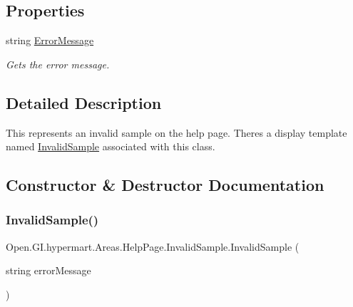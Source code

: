 \subsection*{Properties}
\begin{DoxyCompactItemize}
\item 
string \hyperlink{class_open_1_1_g_i_1_1hypermart_1_1_areas_1_1_help_page_1_1_invalid_sample_a89f95b69edc57c57963b214d0bc844af}{Error\+Message}
\begin{DoxyCompactList}\small\item\em Gets the error message. \end{DoxyCompactList}\end{DoxyCompactItemize}


\subsection{Detailed Description}
This represents an invalid sample on the help page. There\textquotesingle{}s a display template named \hyperlink{class_open_1_1_g_i_1_1hypermart_1_1_areas_1_1_help_page_1_1_invalid_sample}{Invalid\+Sample} associated with this class. 



\subsection{Constructor \& Destructor Documentation}
\hypertarget{class_open_1_1_g_i_1_1hypermart_1_1_areas_1_1_help_page_1_1_invalid_sample_a27e0677e2227b94913ea3072e05094b1}{}\label{class_open_1_1_g_i_1_1hypermart_1_1_areas_1_1_help_page_1_1_invalid_sample_a27e0677e2227b94913ea3072e05094b1} 
\subsubsection{\texorpdfstring{Invalid\+Sample()}{InvalidSample()}}
{\footnotesize\ttfamily Open.\+G\+I.\+hypermart.\+Areas.\+Help\+Page.\+Invalid\+Sample.\+Invalid\+Sample (\begin{DoxyParamCaption}\item[{string}]{error\+Message }\end{DoxyParamCaption})}



